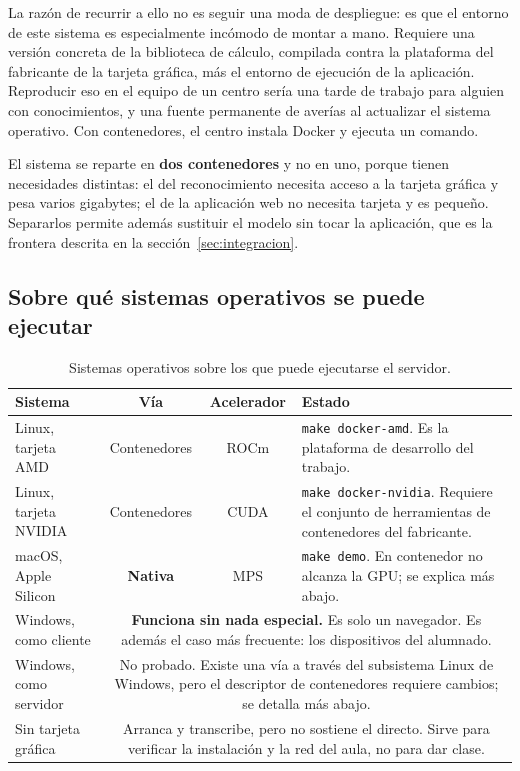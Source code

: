La razón de recurrir a ello no es seguir una moda de despliegue: es que el entorno de este
sistema es especialmente incómodo de montar a mano. Requiere una versión concreta de la
biblioteca de cálculo, compilada contra la plataforma del fabricante de la tarjeta gráfica,
más el entorno de ejecución de la aplicación. Reproducir eso en el equipo de un centro sería
una tarde de trabajo para alguien con conocimientos, y una fuente permanente de averías al
actualizar el sistema operativo. Con contenedores, el centro instala Docker y ejecuta un
comando.

El sistema se reparte en \textbf{dos contenedores} y no en uno, porque tienen necesidades
distintas: el del reconocimiento necesita acceso a la tarjeta gráfica y pesa varios
gigabytes; el de la aplicación web no necesita tarjeta y es pequeño. Separarlos permite
además sustituir el modelo sin tocar la aplicación, que es la frontera descrita en la
sección~\ref{sec:integracion}.

\subsection*{Sobre qué sistemas operativos se puede ejecutar}

\begin{table}[H]
\centering
\footnotesize
\setlength{\tabcolsep}{4pt}
\begin{tabular}{|p{3.1cm}|c|c|p{5.6cm}|}
\hline
\textbf{Sistema} & \textbf{Vía} & \textbf{Acelerador} & \textbf{Estado} \\
\hline
Linux, tarjeta AMD & Contenedores & ROCm &
    \texttt{make docker-amd}. Es la plataforma de desarrollo del trabajo. \\
\hline
Linux, tarjeta NVIDIA & Contenedores & CUDA &
    \texttt{make docker-nvidia}. Requiere el conjunto de herramientas de contenedores del
    fabricante. \\
\hline
macOS, Apple Silicon & \textbf{Nativa} & MPS &
    \texttt{make demo}. En contenedor no alcanza la GPU; se explica más abajo. \\
\hline
Windows, como cliente & \multicolumn{3}{p{8.4cm}|}{\textbf{Funciona sin nada especial.} Es
    solo un navegador. Es además el caso más frecuente: los dispositivos del alumnado.} \\
\hline
Windows, como servidor & \multicolumn{3}{p{8.4cm}|}{No probado. Existe una vía a través del
    subsistema Linux de Windows, pero el descriptor de contenedores requiere cambios; se
    detalla más abajo.} \\
\hline
Sin tarjeta gráfica & \multicolumn{3}{p{8.4cm}|}{Arranca y transcribe, pero no sostiene el
    directo. Sirve para verificar la instalación y la red del aula, no para dar clase.} \\
\hline
\end{tabular}
\caption{Sistemas operativos sobre los que puede ejecutarse el servidor.}
\label{tab:vias}
\end{table}

